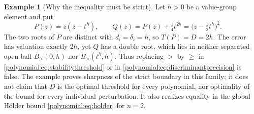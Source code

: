 \documentclass[11pt,letterpaper]{article}
\numberwithin{equation}{section}
\theoremstyle{definition}
\newtheorem{example}[theorem]{Example}
\theoremstyle{remark}\newtheorem{remark}[theorem]{Remark}
\newcommand{\Bgt}[2]{B_{>}(#1,#2)}
\begin{document}
\begin{example}[Why the inequality must be strict]\label{polynomial:ex:sharpdisc}
Let $h>0$ be a value-group element and put
\[
 P(z)=z(z-t^h),\qquad Q(z)=P(z)+\tfrac14t^{2h}=\bigl(z-\tfrac12t^h\bigr)^2 .
\]
The two roots of $P$ are distinct with $d_i=\delta_i=h$, so
$T(P)=D=2h$. The error has valuation exactly $2h$, yet $Q$ has a double root,
which lies in neither separated open ball $\Bgt0h$ nor $\Bgt{t^h}h$. Thus
replacing $>$ by $\ge$ in \eqref{polynomial:eq:stabilitythreshold} or in
\eqref{polynomial:eq:discriminantprecision} is false. The example proves
sharpness of the strict boundary in this family; it does not claim that $D$ is
the optimal threshold for every polynomial, nor optimality of the bound for
every individual perturbation. It also realizes equality in the global
H\"older bound \eqref{polynomial:eq:holder} for $n=2$.
\end{example}
\end{document}
